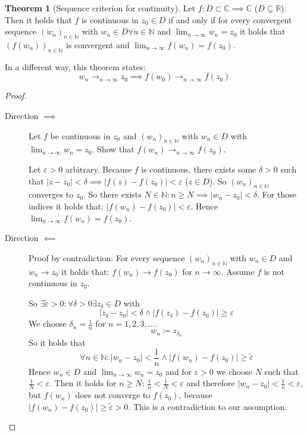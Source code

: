 \documentclass[a4paper,landscape,twocolumn]{article}
\theoremstyle{definition}
\newtheorem{theorem}{Theorem}
\newcommand\abs[1]{\left|#1\right|}
\newcommand\seq[1]{{\left(#1\right)}_{n \in \mathbb N}}
\begin{document}
\begin{theorem}[Sequence criterion for continuity]
  Let $f: D \subset \mathbb C \implies \mathbb C$ ($D \subseteq \mathbb R$).
  Then it holds that $f$ is continuous in $z_0 \in D$ if and only if
  for every convergent sequence $\seq{w_n}$ with $w_n \in D \forall n \in \mathbb N$
  and $\lim_{n\to\infty} w_n = z_0$ it holds that $\seq{f(w_n)}$ is convergent
  and $\lim_{n\to\infty} f(w_n) = f(z_0)$.

  In a different way, this theorem states:
  \[ w_n \to_{n\to\infty} z_0 \implies f(w_0) \to_{n\to\infty} f(z_0) \]
\end{theorem}
\begin{proof}
  \begin{description}
    \item[Direction $\implies$]
      Let $f$ be continuous in $z_0$ and $\seq{w_n}$ with $w_n \in D$ with $\lim_{n\to\infty} w_n = z_0$.
      Show that $f(w_n) \to_{n\to\infty} f(z_0)$.

      Let $\varepsilon > 0$ arbitrary. Because $f$ is continuous, there exists some $\delta > 0$
      such that $\abs{z - z_0} < \delta \implies \abs{f(z) - f(z_0)} < \varepsilon$ ($z \in D$).
      So $\seq{w_n}$ converges to $z_0$.
      So there exists $N \in \mathbb N: n \geq N \implies \abs{w_n - z_0} < \delta$.
      For those indices it holds that: $\abs{f(w_n) - f(z_0)} < \varepsilon$.
      Hence $\lim_{n\to\infty} f(w_n) = f(z_0)$.
    \item[Direction $\impliedby$]
      Proof by contradiction: For every sequence $\seq{w_n}$ with $w_n \in D$ and $w_n \to z_0$
      it holds that: $f(w_n) \to f(z_0)$ for $n \to \infty$.
      Assume $f$ is not continuous in $z_0$.

      So $\exists \tilde{\varepsilon} > 0: \forall \delta > 0 \exists z_\delta \in D$ with
      \[ \abs{z_\delta - z_0} < \delta \land \abs{f(z_\delta) - f(z_0)} \geq \varepsilon \]
      We choose $\delta_n = \frac1n$ for $n = 1,2,3,\ldots$.
      \[ w_n \coloneqq z_{\delta_n} \]
      So it holds that
      \[ \forall n \in \mathbb N: \abs{w_n - z_0} < \frac1n \land \abs{f(w_n) - f(z_0)} \geq \tilde\varepsilon \]
      Hence $w_n \in D$ and $\lim_{n\to\infty} w_n = z_0$ and for $\varepsilon > 0$ we choose $N$
      such that $\frac1N < \varepsilon$. Then it holds for $n \geq N$: $\frac1n < \frac1N < \varepsilon$
      and therefore $\abs{w_n - z_0} < \frac1n < \varepsilon$, but $f(w_n)$ does not converge to $f(z_0)$,
      because $\abs{f(w_n) - f(z_0)} \geq \tilde{\varepsilon} > 0$. This is a contradiction to our assumption.
  \end{description}
\end{proof}
\end{document}
